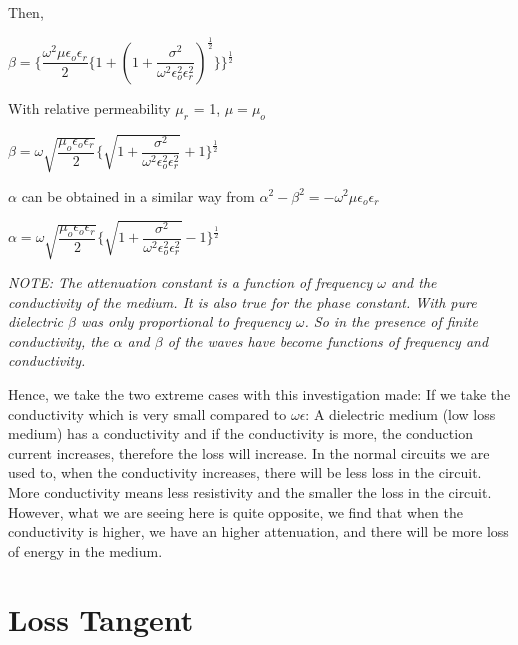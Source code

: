 Then,

\begin{center}
	$\beta =\Bigg\{ \dfrac{\omega^{2}\mu\epsilon_{o}\epsilon_{r}}{2}\bigg\{1 + (1 + \dfrac{\sigma^{2}}{\omega^{2}\epsilon_{o}^{2}\epsilon_{r}^{2}})^{\frac{1}{2}}\bigg\}\Bigg\}^{\frac{1}{2}}$
\end{center}

With relative permeability $\mu_{r}$ = 1, $\mu = \mu_{o}$

\begin{center}
$\beta = \omega\sqrt{\dfrac{\mu_{o}\epsilon_{o}\epsilon_{r}}{2}}\Bigg\{{\sqrt{1 + \dfrac{\sigma^{2}}{\omega^{2}\epsilon_{o}^{2}\epsilon_{r}^{2}}}} + 1\Bigg\}^{\frac{1}{2}}$
\end{center}

$\alpha$ can be obtained in a similar way from $\alpha^{2} - \beta^{2} = -\omega^{2}\mu\epsilon_{o}\epsilon_{r}$

\begin{center}
$\alpha = \omega\sqrt{\dfrac{\mu_{o}\epsilon_{o}\epsilon_{r}}{2}}\Bigg\{{\sqrt{1 + \dfrac{\sigma^{2}}{\omega^{2}\epsilon_{o}^{2}\epsilon_{r}^{2}}}} - 1\Bigg\}^{\frac{1}{2}}$
\end{center}

\textit{NOTE: The attenuation constant is a function of frequency $\omega$ and the conductivity of the medium. It is also true for the phase constant. With pure dielectric $\beta$ was only proportional to frequency $\omega$. So in the presence of finite conductivity, the $\alpha$ and $\beta$ of the waves have become functions of frequency and conductivity.}

Hence, we take the two extreme cases with this investigation made:
If we take the conductivity which is very small compared to $\omega\epsilon$: A dielectric medium (low loss medium) has a conductivity and if the conductivity is more, the conduction current increases, therefore the loss will increase. In the normal circuits we are used to, when the conductivity increases, there will be less loss in the circuit. More conductivity means less resistivity and the smaller the loss in the circuit. However, what we are seeing here is quite opposite, we find that when the conductivity is higher, we have an higher attenuation, and there will be more loss of energy in the medium.

\section{\textbf{Loss Tangent}}


